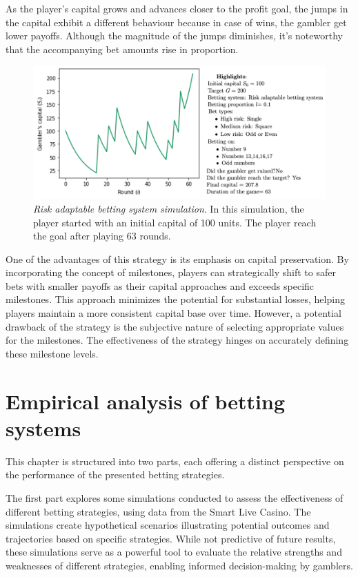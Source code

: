 \documentclass[11pt,twoside]{article}
\numberwithin{Theorem}{section}
\numberwithin{Definition}{section}
\numberwithin{Lemma}{section}
\numberwithin{Algorithm}{section}
\numberwithin{equation}{section}
\begin{document}
As the player's capital grows and advances closer to the profit goal, the jumps in the capital exhibit a different behaviour because in case of wins, the gambler get lower payoffs. Although the magnitude of the jumps diminishes, it's noteworthy that the accompanying bet amounts rise in proportion.
\begin{figure}[H]
        \centering
        \includegraphics[width=13cm]{mixed_ex_1.png}
        \caption[Risk adaptable betting system simulation]{\textit{Risk adaptable betting system simulation}. In this simulation, the player started with an initial capital of 100 units. The player reach the goal after playing 63 rounds.}\label{sim_mixed_22}
\end{figure}

One of the advantages of this strategy is its emphasis on capital preservation. By incorporating the concept of milestones, players can strategically shift to safer bets with smaller payoffs as their capital approaches and exceeds specific milestones. This approach minimizes the potential for substantial losses, helping players maintain a more consistent capital base over time. However, a potential drawback of the strategy is the subjective nature of selecting appropriate values for the milestones. The effectiveness of the strategy hinges on accurately defining these milestone levels. 

\clearpage
\section{Empirical analysis of betting systems}\label{Empirical_analysis}
This chapter is structured into two parts, each offering a distinct perspective on the performance of the presented betting strategies.

The first part explores some simulations conducted to assess the effectiveness of different betting strategies, using data from the Smart Live Casino. The simulations create hypothetical scenarios illustrating potential outcomes and trajectories based on specific strategies. While not predictive of future results, these simulations serve as a powerful tool to evaluate the relative strengths and weaknesses of different strategies, enabling informed decision-making by gamblers.
\end{document}
